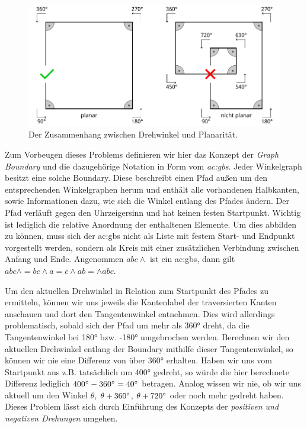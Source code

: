 \begin{figure}[t]
    \centering
    \includegraphics[width=(\imgWidth*3/4)]{images/planarity.pdf}
    \caption{Der Zusammenhang zwischen Drehwinkel und Planarität.}
    \label{fig:planarity}
\end{figure}

Zum Vorbeugen dieses Problems definieren wir hier das Konzept der \textit{Graph Boundary} und die dazugehörige Notation in Form vom
\textit{\gls{ac:gbs}}. Jeder Winkelgraph besitzt eine solche Boundary. Diese beschreibt einen Pfad außen um den entsprechenden
Winkelgraphen herum und enthält alle vorhandenen Halbkanten, sowie Informationen dazu, wie sich die Winkel entlang des Pfades ändern.
Der Pfad verläuft gegen den Uhrzeigersinn und hat keinen festen Startpunkt. Wichtig ist lediglich die relative Anordnung der enthaltenen
Elemente. Um dies abbilden zu können, muss sich der \gls{ac:gbs} nicht als Liste mit festem Start- und Endpunkt vorgestellt werden,
sondern als Kreis mit einer zusätzlichen Verbindung zwischen Anfang und Ende. Angenommen \(abc\wedge\) ist ein \gls{ac:gbs}, dann gilt
\(abc\wedge = bc\wedge a = c\wedge ab = \wedge abc\).

Um den aktuellen Drehwinkel in Relation zum Startpunkt des Pfades zu ermitteln, können wir uns jeweils die Kantenlabel der traversierten
Kanten anschauen und dort den Tangentenwinkel entnehmen. Dies wird allerdings problematisch, sobald sich der Pfad um mehr als
360° dreht, da die Tangentenwinkel bei 180° bzw. -180° umgebrochen werden. Berechnen wir den aktuellen Drehwinkel entlang der Boundary mithilfe
dieser Tangentenwinkel, so können wir nie eine Differenz von über 360° erhalten. Haben wir uns vom Startpunkt aus z.B. tatsächlich um 400°
gedreht, so würde die hier berechnete Differenz lediglich \(400\degree - 360\degree = 40\degree\) betragen. Analog wissen wir nie, ob wir uns
aktuell um den Winkel \(\theta\), \(\theta + 360\degree\), \(\theta + 720\degree\) oder noch mehr gedreht haben.
Dieses Problem lässt sich durch Einführung des Konzepts der \textit{positiven und negativen Drehungen} umgehen.


